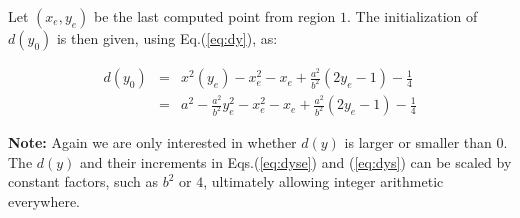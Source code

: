 \documentclass[12pt]{scrartcl}
\def\fab{\frac{a^2}{b^2}}
\def\dy{d(y)}
\def\fof{\frac{1}{4}}
\begin{document}
Let $(x_e,y_e)$ be the last computed point from region $1$. The 
initialization of $d(y_0)$ is then given, using Eq.(\ref{eq:dy}), as:

\begin{eqnarray*}
d(y_0) &=& x^2(y_e) - x_e^2 - x_e + \fab(2y_e-1) - \fof \\
       &=& a^2 - \fab y_e^2 - x_e^2 - x_e + \fab(2y_e-1) - \fof
\end{eqnarray*}

\textbf{Note:} Again we are only interested in whether $\dy$ is larger or
smaller than $0$. The $\dy$ and their increments in Eqs.(\ref{eq:dyse}) 
and (\ref{eq:dys}) can be scaled by constant factors, such as
$b^2$ or $4$, ultimately allowing integer arithmetic everywhere.
\end{document}
